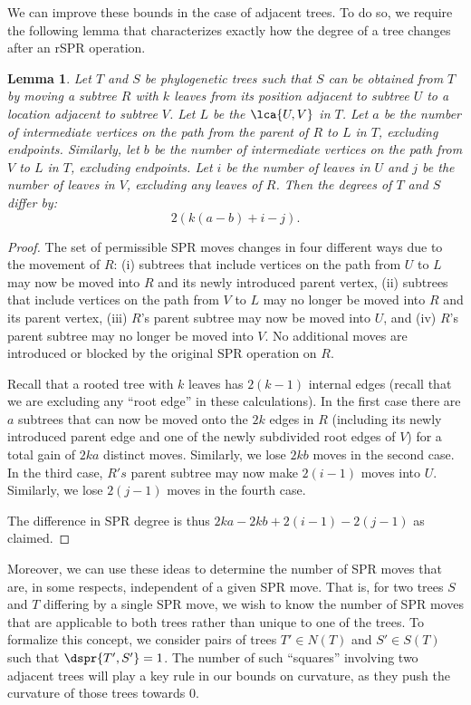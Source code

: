 \documentclass{amsart}
\newtheorem{lemma}[theorem]{Lemma}
\begin{document}
We can improve these bounds in the case of adjacent trees.
To do so, we require the following lemma that characterizes exactly how the degree of a tree changes after an rSPR operation.

\begin{lemma}
\label{lem:degree_change}
Let $T$ and $S$ be phylogenetic trees such that $S$ can be obtained from $T$ by moving a subtree $R$ with $k$ leaves from its position adjacent to subtree $U$ to a location adjacent to subtree $V$.
Let $L$ be the $\lca{U,V}$ in $T$.
Let $a$ be the number of intermediate vertices on the path from the parent of $R$ to $L$ in $T$, excluding endpoints.
Similarly, let $b$ be the number of intermediate vertices on the path from $V$ to $L$ in $T$, excluding endpoints.
Let $i$ be the number of leaves in $U$ and $j$ be the number of leaves in $V$, excluding any leaves of $R$.
Then the degrees of $T$ and $S$ differ by:
$$2\left(k(a-b) + i - j\right).$$

\end{lemma}
\begin{proof}
The set of permissible SPR moves changes in four different ways due to the movement of $R$:
(i) subtrees that include vertices on the path from $U$ to $L$ may now be moved into $R$ and its newly introduced parent vertex,
(ii) subtrees that include vertices on the path from $V$ to $L$ may no longer be moved into $R$ and its parent vertex,
(iii) $R$'s parent subtree may now be moved into $U$, and
(iv) $R$'s parent subtree may no longer be moved into $V$.
No additional moves are introduced or blocked by the original SPR operation on $R$.

Recall that a rooted tree with $k$ leaves has $2(k-1)$ internal edges (recall that we are excluding any ``root edge'' in these calculations).
In the first case there are $a$ subtrees that can now be moved onto the $2k$ edges in $R$ (including its newly introduced parent edge and one of the newly subdivided root edges of $V$) for a total gain of $2ka$ distinct moves.
Similarly, we lose $2kb$ moves in the second case.
In the third case, $R's$ parent subtree may now make $2(i-1)$ moves into $U$.
Similarly, we lose $2(j-1)$ moves in the fourth case.

The difference in SPR degree is thus $2ka - 2kb + 2(i-1) - 2(j-1)$ as claimed.
\end{proof}

Moreover, we can use these ideas to determine the number of SPR moves that are, in some respects, independent of a given SPR move.
That is, for two trees $S$ and $T$ differing by a single SPR move, we wish to know the number of SPR moves that are applicable to both trees rather than unique to one of the trees.
To formalize this concept, we consider pairs of trees $T' \in N(T)$ and $S' \in S(T)$ such that $\dspr{T',S'} = 1$.
The number of such ``squares'' involving two adjacent trees will play a key rule in our bounds on curvature, as they push the curvature of those trees towards 0.
\end{document}
